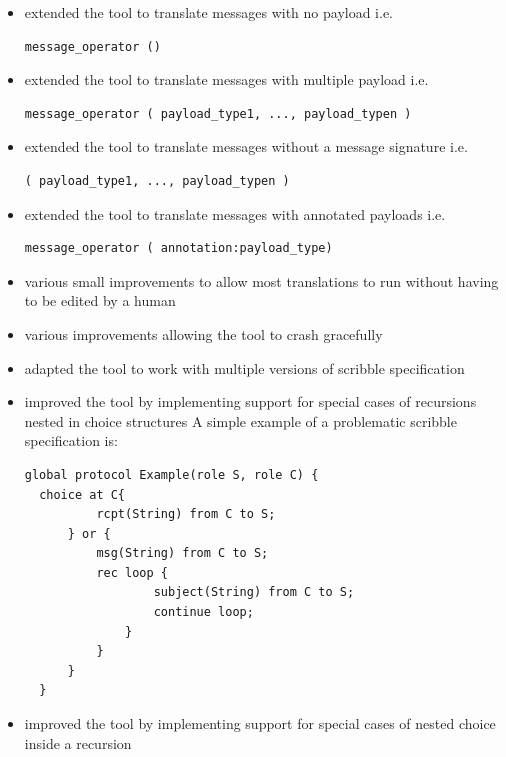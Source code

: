 \begin{itemize}
\item extended the tool to translate messages with no payload i.e.
\begin{lstlisting}[basicstyle=\footnotesize]
  message_operator ()
\end{lstlisting}
\item extended the tool to translate messages with multiple payload i.e.
\begin{lstlisting}[basicstyle=\footnotesize]
  message_operator ( payload_type1, ..., payload_typen )
\end{lstlisting}
\item extended the tool to translate messages without a message signature i.e.
\begin{lstlisting}[basicstyle=\footnotesize]
  ( payload_type1, ..., payload_typen )
\end{lstlisting}
\item extended the tool to translate messages with annotated payloads i.e.
\begin{lstlisting}[basicstyle=\footnotesize]
  message_operator ( annotation:payload_type)
\end{lstlisting}
\item various small improvements to allow most translations to run without having to be edited by a human
\item various improvements allowing the tool to crash gracefully
\item adapted the tool to work with multiple versions of scribble specification
\item improved the tool by implementing support for special cases of recursions nested in choice structures
A simple example of a problematic scribble specification is:
\begin{lstlisting}[basicstyle=\footnotesize]
  global protocol Example(role S, role C) {
  choice at C{
          rcpt(String) from C to S;
      } or {
          msg(String) from C to S;
          rec loop {
                  subject(String) from C to S;
                  continue loop;
              }
          }
      }
  }
\end{lstlisting}
\item improved the tool by implementing support for special cases of nested choice inside a recursion


\end{itemize}
